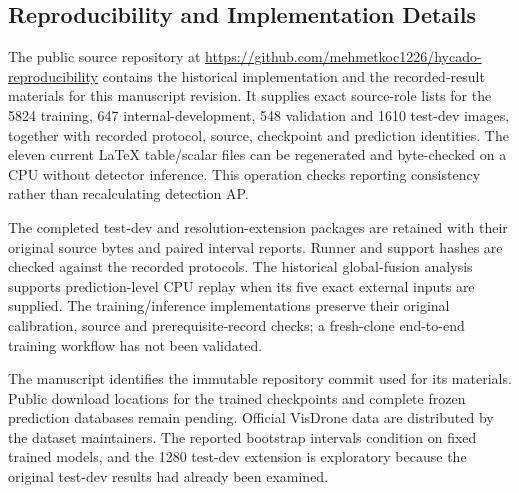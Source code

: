 \subsection{Reproducibility and Implementation Details}
The public source repository at \url{https://github.com/mehmetkoc1226/hycado-reproducibility} contains the historical implementation and the recorded-result materials for this manuscript revision. It supplies exact source-role lists for the 5824 training, 647 internal-development, 548 validation and 1610 test-dev images, together with recorded protocol, source, checkpoint and prediction identities. The eleven current LaTeX table/scalar files can be regenerated and byte-checked on a CPU without detector inference. This operation checks reporting consistency rather than recalculating detection AP.

The completed test-dev and resolution-extension packages are retained with their original source bytes and paired interval reports. Runner and support hashes are checked against the recorded protocols. The historical global-fusion analysis supports prediction-level CPU replay when its five exact external inputs are supplied. The training/inference implementations preserve their original calibration, source and prerequisite-record checks; a fresh-clone end-to-end training workflow has not been validated.

The manuscript identifies the immutable repository commit used for its materials. Public download locations for the trained checkpoints and complete frozen prediction databases remain pending. Official VisDrone data are distributed by the dataset maintainers. The reported bootstrap intervals condition on fixed trained models, and the 1280 test-dev extension is exploratory because the original test-dev results had already been examined.
